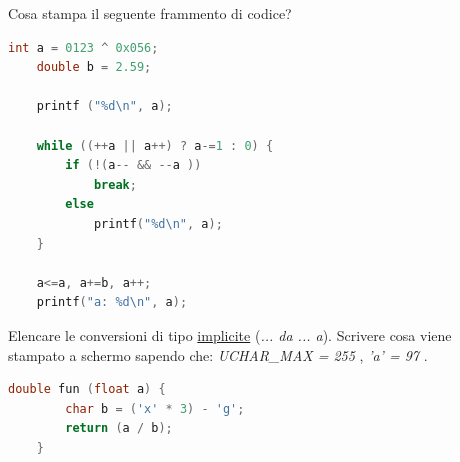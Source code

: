 
\begin{center}
\end{center}

\vspace{5mm}

\noindent{}

\begin{questions}


\question[5]
Cosa stampa il seguente frammento di codice?

\begin{minipage}[t]{0.4\linewidth}
	\begin{lstlisting}[language=C]
	int a = 0123 ^ 0x056;
	double b = 2.59;

	printf ("%d\n", a);
	
	while ((++a || a++) ? a-=1 : 0) {
		if (!(a-- && --a ))
			break;
		else
			printf("%d\n", a);
	}
	
	a<=a, a+=b, a++;
	printf("a: %d\n", a); 
	\end{lstlisting}
\end{minipage}
\begin{minipage}[t]{0.6\linewidth}
\end{minipage}



\question[6]
Elencare le conversioni di tipo \underline{implicite} (\emph{... da ... a}). Scrivere cosa viene stampato a schermo sapendo che: \emph{UCHAR\_MAX = 255} , \emph{'a' = 97} .

\begin{minipage}[t]{0.4\linewidth}
	\begin{lstlisting}[language=C]
	double fun (float a) {
		char b = ('x' * 3) - 'g';
		return (a / b);
	}
	

\end{lstlisting}
\end{minipage}
\end{questions}
